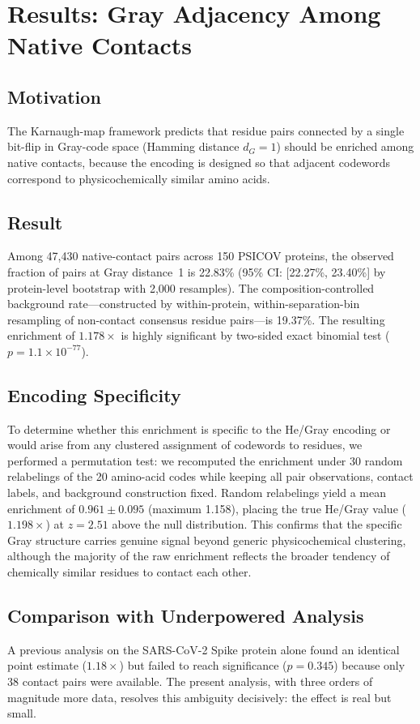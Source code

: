 \section{Results: Gray Adjacency Among Native Contacts}
\label{sec:results-gray}

\subsection{Motivation}
The Karnaugh-map framework predicts that residue pairs connected by a single
bit-flip in Gray-code space (Hamming distance $d_G = 1$) should be enriched
among native contacts, because the encoding is designed so that adjacent
codewords correspond to physicochemically similar amino acids.

\subsection{Result}
Among 47{,}430 native-contact pairs across 150 PSICOV proteins, the observed
fraction of pairs at Gray distance~1 is 22.83\% (95\% CI: [22.27\%, 23.40\%]
by protein-level bootstrap with 2{,}000 resamples).  The composition-controlled
background rate---constructed by within-protein, within-separation-bin
resampling of non-contact consensus residue pairs---is 19.37\%.  The resulting
enrichment of $1.178\times$ is highly significant by two-sided exact binomial
test ($p = 1.1 \times 10^{-77}$).

\subsection{Encoding Specificity}
To determine whether this enrichment is specific to the He/Gray encoding or
would arise from any clustered assignment of codewords to residues, we
performed a permutation test: we recomputed the enrichment under 30 random
relabelings of the 20 amino-acid codes while keeping all pair observations,
contact labels, and background construction fixed.  Random relabelings yield
a mean enrichment of $0.961 \pm 0.095$ (maximum 1.158), placing the true
He/Gray value ($1.198\times$) at $z = 2.51$ above the null distribution.
This confirms that the specific Gray structure carries genuine signal beyond
generic physicochemical clustering, although the majority of the raw
enrichment reflects the broader tendency of chemically similar residues to
contact each other.

\subsection{Comparison with Underpowered Analysis}
A previous analysis on the SARS-CoV-2 Spike protein alone found an identical
point estimate ($1.18\times$) but failed to reach significance ($p = 0.345$)
because only 38 contact pairs were available.  The present analysis, with
three orders of magnitude more data, resolves this ambiguity decisively:
the effect is real but small.
